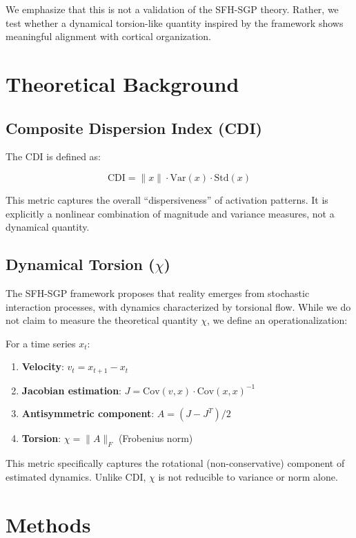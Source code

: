 \documentclass[11pt]{article}
\begin{document}
We emphasize that this is not a validation of the SFH-SGP theory. Rather, we test whether a dynamical torsion-like quantity inspired by the framework shows meaningful alignment with cortical organization.

\section{Theoretical Background}

\subsection{Composite Dispersion Index (CDI)}

The CDI is defined as:

\[
	\text{CDI} = \|x\| \cdot \text{Var}(x) \cdot \text{Std}(x)
\]

This metric captures the overall ``dispersiveness'' of activation patterns. It is explicitly a nonlinear combination of magnitude and variance measures, not a dynamical quantity.

\subsection{Dynamical Torsion ($\chi$)}

The SFH-SGP framework proposes that reality emerges from stochastic interaction processes, with dynamics characterized by torsional flow. While we do not claim to measure the theoretical quantity $\chi$, we define an operationalization:

For a time series $x_t$:

\begin{enumerate}
	\item \textbf{Velocity}: $v_t = x_{t+1} - x_t$
	\item \textbf{Jacobian estimation}: $J = \text{Cov}(v, x) \cdot \text{Cov}(x, x)^{-1}$
	\item \textbf{Antisymmetric component}: $A = (J - J^T) / 2$
	\item \textbf{Torsion}: $\chi = \|A\|_F$ (Frobenius norm)
\end{enumerate}

This metric specifically captures the rotational (non-conservative) component of estimated dynamics. Unlike CDI, $\chi$ is not reducible to variance or norm alone.

\section{Methods}
\end{document}
